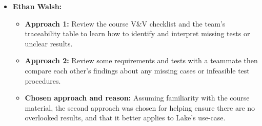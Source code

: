 \documentclass[12pt, titlepage]{article}
\begin{document}
\begin{enumerate}
\begin{itemize}
    \item \textbf{Ethan Walsh:}
    \begin{itemize}
      \item \textbf{Approach 1:}
      Review the course V\&V checklist and the team's traceability table to learn how to identify and interpret missing tests or unclear results.
      \item \textbf{Approach 2:}
      Review some requirements and tests with a teammate then compare each other's findings about any missing cases or infeasible test procedures.
      \item \textbf{Chosen approach and reason:}
      Assuming familiarity with the course material, the second approach was chosen for helping ensure there are no overlooked results, and that it better applies to Lake's use-case.
    \end{itemize}

  \end{itemize}
\end{enumerate}
\end{document}
